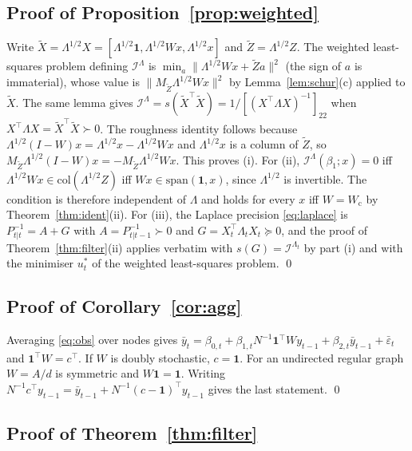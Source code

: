 \documentclass[12pt]{article}
\theoremstyle{plain}
\theoremstyle{definition}
\theoremstyle{remark}
\newcommand{\one}{\mathbf{1}}
\newcommand{\calI}{\mathcal{I}}
\newcommand{\Wc}{W_{\mathrm{c}}}
\newcommand{\T}{^{\top}}
\begin{document}
\subsection{Proof of Proposition~\ref{prop:weighted}}
Write $\tilde X=\Lambda^{1/2}X=[\Lambda^{1/2}\one,\Lambda^{1/2}Wx,\Lambda^{1/2}x]$ and $\tilde Z=\Lambda^{1/2}Z$. The weighted least-squares problem defining $\calI^\Lambda$ is $\min_a\|\Lambda^{1/2}Wx+\tilde Za\|^2$ (the sign of $a$ is immaterial), whose value is $\|M_{\tilde Z}\Lambda^{1/2}Wx\|^2$ by Lemma~\ref{lem:schur}(c) applied to $\tilde X$. The same lemma gives $\calI^\Lambda=s(\tilde X\T\tilde X)=1/[(X\T\Lambda X)^{-1}]_{22}$ when $X\T\Lambda X=\tilde X\T\tilde X\succ0$. The roughness identity follows because $\Lambda^{1/2}(I-W)x=\Lambda^{1/2}x-\Lambda^{1/2}Wx$ and $\Lambda^{1/2}x$ is a column of $\tilde Z$, so $M_{\tilde Z}\Lambda^{1/2}(I-W)x=-M_{\tilde Z}\Lambda^{1/2}Wx$. This proves (i). For (ii), $\calI^\Lambda(\beta_1;x)=0$ iff $\Lambda^{1/2}Wx\in\mathrm{col}(\Lambda^{1/2}Z)$ iff $Wx\in\mathrm{span}(\one,x)$, since $\Lambda^{1/2}$ is invertible. The condition is therefore independent of $\Lambda$ and holds for every $x$ iff $W=\Wc$ by Theorem~\ref{thm:ident}(ii). For (iii), the Laplace precision \eqref{eq:laplace} is $P_{t|t}^{-1}=A+G$ with $A=P_{t|t-1}^{-1}\succ0$ and $G=X_t\T\Lambda_tX_t\succeq0$, and the proof of Theorem~\ref{thm:filter}(ii) applies verbatim with $s(G)=\calI^{\Lambda_t}$ by part (i) and with the minimiser $u_t^*$ of the weighted least-squares problem. \qed

\subsection{Proof of Corollary~\ref{cor:agg}}
Averaging \eqref{eq:obs} over nodes gives $\bar y_t=\beta_{0,t}+\beta_{1,t}N^{-1}\one\T Wy_{t-1}+\beta_{2,t}\bar y_{t-1}+\bar\varepsilon_t$ and $\one\T W=c\T$. If $W$ is doubly stochastic, $c=\one$. For an undirected regular graph $W=A/d$ is symmetric and $W\one=\one$. Writing $N^{-1}c\T y_{t-1}=\bar y_{t-1}+N^{-1}(c-\one)\T y_{t-1}$ gives the last statement. \qed

\subsection{Proof of Theorem~\ref{thm:filter}}
\end{document}

